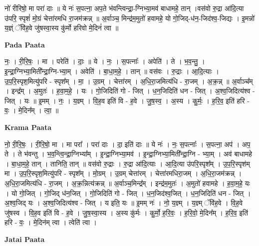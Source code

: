 \documentclass[17pt]{extarticle}
\begin{document}
नो॑ रीरिषो॒ मा परा॑ दाः ॥ ये नः॑ स॒पत्ना॒ अप॒ते भ॑वन्त्विन्द्रा॒-ग्निभ्या॒मव॑ बाधामहे॒ तान् ।वस॑वो रु॒द्रा आ॑दि॒त्या उ॑परि॒ स्पृशं॑ मो॒ग्रं चेत्ता॑रमधि रा॒जम॑क्रन्न् ॥ अ॒र्वाञ्च॒ मिन्द्र॑म॒मुतो॑ हवामहे॒ यो गो॒जिद्-ध॑न॒-जिद॑श्व॒-जिद्यः । इ॒मन्नो॑ य॒ज्ञ्ं ॅवि॑ह॒वे जु॑षस्वा॒स्य कु॑र्मो हरिवो मे॒दिनं॑ त्वा ॥ \newline

\textbf{Pada Paata} \newline

नः॒ । री॒रि॒षः॒ । मा । परेति॑ । दाः॒ ॥ ये । नः॒ । स॒पत्नाः᳚ । अपेति॑ । ते । भ॒व॒न्तु॒ । इ॒न्द्रा॒ग्निभ्या॒मिती᳚न्द्रा॒ग्नि-भ्या॒म् । अवेति॑ । बा॒धा॒म॒हे॒ । तान् ॥ वस॑वः । रु॒द्राः । आ॒दि॒त्याः । उ॒प॒रि॒स्पृश॒मित्यु॑परि - स्पृश᳚म् । मा॒ । उ॒ग्रम् । चेत्ता॑रम् । अ॒धि॒रा॒जमित्य॑धि - रा॒जम् । अ॒क्र॒न्न् ॥ अ॒र्वाञ्च᳚म् । इन्द्र᳚म् । अ॒मुतः॑ । ह॒वा॒म॒हे॒ । यः । गो॒जिदिति॑ गो - जित् । ध॒न॒जिदिति॑ धन - जित् । अ॒श्व॒जिदित्य॑श्व - जित् । यः ॥ इ॒मम् । नः॒ । य॒ज्ञ्म् । वि॒ह॒व इति॑ वि - ह॒वे । जु॒ष॒स्व॒ । अ॒स्य । कु॒र्मः॒ । ह॒रि॒व॒ इति॑ हरि - वः॒ । मे॒दिन᳚म् । त्वा॒ ॥  \newline


\textbf{Krama Paata} \newline

नो॒ री॒रि॒षः॒ । री॒रि॒षो॒ मा । मा परा᳚ । परा॑ दाः । दा॒ इति॑ दाः ॥ ये नः॑ । नः॒ स॒पत्नाः᳚ । स॒पत्ना॒ अप॑ । अप॒ ते । ते भ॑वन्तु । भ॒व॒न्त्वि॒न्द्रा॒ग्निभ्या᳚म् । इ॒न्द्रा॒ग्निभ्या॒मव॑ । इ॒न्द्रा॒ग्निभ्या॒मिती᳚न्द्रा॒ग्नि - भ्या॒म् । अव॑ बाधामहे । बा॒धा॒म॒हे॒ तान् । तानिति॒ तान् ॥ वस॑वो रु॒द्राः । रु॒द्रा आ॑दि॒त्याः । आ॒दि॒त्या उ॑परि॒स्पृश᳚म् । उ॒प॒रि॒स्पृश॑म् मा । उ॒प॒रि॒स्पृश॒मित्यु॑परि - स्पृश᳚म् । मो॒ग्रम् । उ॒ग्रम् चेत्ता॑रम् । चेत्ता॑रमधिरा॒जम् । अ॒धि॒रा॒जम॑क्रन्न् । अ॒धि॒रा॒जमित्य॑धि - रा॒जम् । अ॒क्र॒न्नित्य॑क्रन्न् ॥ अ॒र्वाञ्च॒मिन्द्र᳚म् । इन्द्र॑म॒मुतः॑ । अ॒मुतो॑ हवामहे । ह॒वा॒म॒हे॒ यः । यो गो॒जित् । गो॒जिद् ध॑न॒जित् । गो॒जिदिति॑ गो - जित् । ध॒न॒जिद॑श्व॒जित् । ध॒न॒जिदिति॑ धन - जित् । अ॒श्व॒जिद् यः । अ॒श्व॒जिदित्य॑श्व - जित् । य इति॒ यः ॥ इ॒मम् नः॑ । नो॒ य॒ज्ञ्म् । य॒ज्ञ्म् ॅवि॑ह॒वे । वि॒ह॒वे जु॑षस्व । वि॒ह॒व इति॑ वि - ह॒वे । जु॒ष॒स्वा॒स्य । अ॒स्य कु॑र्मः । कु॒र्मो॒ ह॒रि॒वः॒ । ह॒रि॒वो॒ मे॒दिन᳚म् । ह॒रि॒व॒ इति॑ हरि - वः॒ । मे॒दिन॑म् त्वा । त्वेति॑ त्वा । \newline

\textbf{Jatai Paata} \newline
\end{document}
